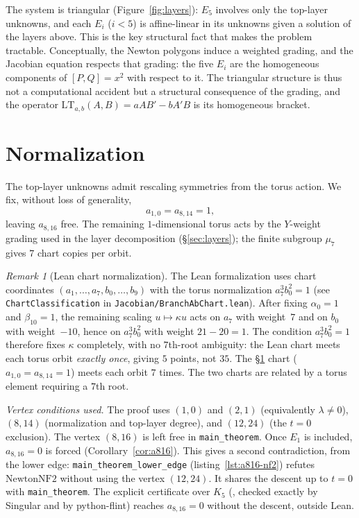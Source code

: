 \documentclass[a4paper,11pt]{article}
\newcommand{\filename}[1]{\texttt{\seqsplit{#1}}}
\theoremstyle{plain}
\theoremstyle{definition}
\theoremstyle{remark}
\newtheorem{remark}[theorem]{Remark}
\begin{document}
The system is triangular (Figure~\ref{fig:layers}): $E_5$ involves only the top-layer unknowns, and each $E_i$ ($i<5$) is affine-linear in its unknowns given a solution of the layers above. This is the key structural fact that makes the problem tractable. Conceptually, the Newton polygons induce a weighted grading, and the Jacobian equation respects that grading: the five $E_i$ are the homogeneous components of $[P,Q]=x^2$ with respect to it. The triangular structure is thus not a computational accident but a structural consequence of the grading, and the operator $\mathrm{LT}_{a,b}(A,B)=aAB'-bA'B$ is its homogeneous bracket.

\section{Normalization}\label{sec:normalization}

The top-layer unknowns admit rescaling symmetries from the torus action. We fix, without loss of generality,
\begin{equation}\label{eq:normalization}
a_{1,0}=a_{8,14}=1,
\end{equation}
leaving $a_{8,16}$ free. The remaining $1$-dimensional torus acts by the $Y$-weight grading used in the layer decomposition (\S\ref{sec:layers}); the finite subgroup $\mu_7$ gives $7$ chart copies per orbit.

\begin{remark}[Lean chart normalization]
The Lean formalization uses chart coordinates $(a_1,\dots,a_7,b_0,\dots,b_9)$ with the torus normalization $a_7^3 b_0^2 = 1$ (see \texttt{ChartClassification} in \texttt{Jacobian/BranchAbChart.lean}). After fixing $\alpha_0 = 1$ and $\beta_{10} = 1$, the remaining scaling $u \mapsto \kappa u$ acts on $a_7$ with weight~$7$ and on $b_0$ with weight~$-10$, hence on $a_7^3 b_0^2$ with weight $21 - 20 = 1$. The condition $a_7^3 b_0^2 = 1$ therefore fixes $\kappa$ completely, with no $7$th-root ambiguity: the Lean chart meets each torus orbit \emph{exactly once}, giving $5$ points, not $35$. The \S\ref{sec:normalization} chart ($a_{1,0} = a_{8,14} = 1$) meets each orbit $7$ times. The two charts are related by a torus element requiring a $7$th root.
\end{remark}

\emph{Vertex conditions used.}\label{sec:lower-edge} The proof uses $(1,0)$ and $(2,1)$ (equivalently $\lambda\neq0$), $(8,14)$ (normalization and top-layer degree), and $(12,24)$ (the $t=0$ exclusion). The vertex $(8,16)$ is left free in \texttt{main\_theorem}. Once $E_1$ is included, $a_{8,16}=0$ is forced (Corollary~\ref{cor:a816}). This gives a second contradiction, from the lower edge: \texttt{main\_theorem\_lower\_edge} (listing~\ref{lst:a816-nf2}) refutes $\mathrm{NewtonNF2}$ without using the vertex $(12,24)$. It shares the descent up to $t=0$ with \texttt{main\_theorem}. The explicit certificate over $K_5$ (\filename{scripts/a816\_certificate/}, checked exactly by {\sc Singular} and by python-flint) reaches $a_{8,16}=0$ without the descent, outside Lean.
\end{document}
